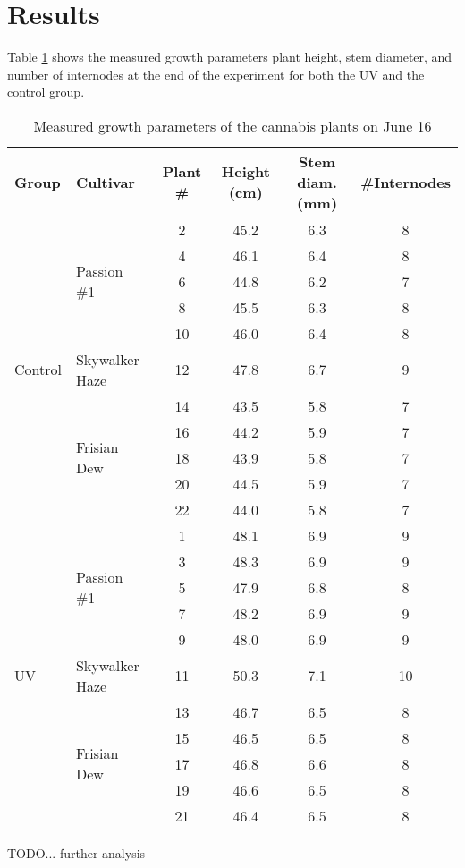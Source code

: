 \section{Results}

Table \ref{tab:measured_growth_parameters} shows the measured growth parameters plant height, stem diameter, and number of internodes at the end of the experiment for both the UV and the control group.

\begin{table}[htbp]
    \caption{Measured growth parameters of the cannabis plants on June 16}
    \label{tab:measured_growth_parameters}
    \begin{tabularx}{\linewidth}{llcccc}
        \toprule
        \textbf{Group} & \textbf{Cultivar} & \textbf{Plant \#} & \textbf{Height (\unit[mode=text]{\cm})} & \textbf{Stem diam. (\unit[mode=text]{\mm})} & \textbf{\#{}Internodes} \\
        \midrule
        \multirow{11}{*}{Control} & \multirow{5}{*}{Passion \#1} & 2 & 45.2 & 6.3 & 8 \\
        & & 4 & 46.1 & 6.4 & 8 \\
        & & 6 & 44.8 & 6.2 & 7 \\
        & & 8 & 45.5 & 6.3 & 8 \\
        & & 10 & 46.0 & 6.4 & 8 \\
        & Skywalker Haze & 12 & 47.8 & 6.7 & 9 \\
        & \multirow{5}{*}{Frisian Dew} & 14 & 43.5 & 5.8 & 7 \\
        & & 16 & 44.2 & 5.9 & 7 \\
        & & 18 & 43.9 & 5.8 & 7 \\
        & & 20 & 44.5 & 5.9 & 7 \\
        & & 22 & 44.0 & 5.8 & 7 \\
        \midrule
        \multirow{11}{*}{UV} & \multirow{5}{*}{Passion \#1} & 1 & 48.1 & 6.9 & 9 \\
        & & 3 & 48.3 & 6.9 & 9 \\
        & & 5 & 47.9 & 6.8 & 8 \\
        & & 7 & 48.2 & 6.9 & 9 \\
        & & 9 & 48.0 & 6.9 & 9 \\
        & Skywalker Haze & 11 & 50.3 & 7.1 & 10 \\
        & \multirow{5}{*}{Frisian Dew} & 13 & 46.7 & 6.5 & 8 \\
        & & 15 & 46.5 & 6.5 & 8 \\
        & & 17 & 46.8 & 6.6 & 8 \\
        & & 19 & 46.6 & 6.5 & 8 \\
        & & 21 & 46.4 & 6.5 & 8 \\
        \bottomrule
    \end{tabularx}
\end{table}

TODO... further analysis